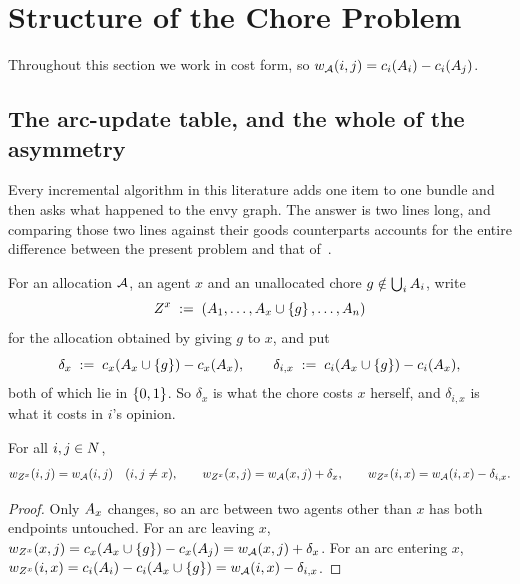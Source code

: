 \section{Structure of the Chore Problem}
\label{sec:structure}

Throughout this section we work in cost form, so
$w_{\mathcal{A}}(i,j) = c_i(A_{i}) - c_i(A_{j})$.

\subsection{The arc-update table, and the whole of the asymmetry}
\label{sec:arcupdate}

Every incremental algorithm in this literature adds one item to one bundle and
then asks what happened to the envy graph. The answer is two lines long, and
comparing those two lines against their goods counterparts accounts for the
entire difference between the present problem and that of~\cite{BKNS22}.

For an allocation $\mathcal{A}$, an agent $x$ and an unallocated chore
$g \notin \bigcup_i A_{i}$, write
\[
  Z^x \;:=\; (A_{1}, \dots, A_{x} \cup \left\{g\right\}, \dots, A_{n})
\]
for the allocation obtained by giving $g$ to $x$, and put
\[
  \delta_x \;:=\; c_x(A_{x} \cup \left\{g\right\}) - c_x(A_{x}),
  \qquad
  \delta_{i,x} \;:=\; c_i(A_{x} \cup \left\{g\right\}) - c_i(A_{x}),
\]
both of which lie in $\left\{0,1\right\}$. So $\delta_x$ is what the chore costs $x$
herself, and $\delta_{i,x}$ is what it costs in $i$'s opinion.

\begin{lemma}
\label{lem:arcupdate}
For all $i,j \in N$,
\[
  w_{Z^x}(i,j) = w_{\mathcal{A}}(i,j) \quad (i,j \ne x),
  \qquad
  w_{Z^x}(x,j) = w_{\mathcal{A}}(x,j) + \delta_x,
  \qquad
  w_{Z^x}(i,x) = w_{\mathcal{A}}(i,x) - \delta_{i,x}.
\]
\end{lemma}

\begin{proof}
Only $A_{x}$ changes, so an arc between two agents other than $x$ has both
endpoints untouched. For an arc leaving $x$,
$w_{Z^x}(x,j) = c_x(A_{x} \cup \left\{g\right\}) - c_x(A_{j})
= w_{\mathcal{A}}(x,j) + \delta_x$. For an arc entering $x$,
$w_{Z^x}(i,x) = c_i(A_{i}) - c_i(A_{x} \cup \left\{g\right\})
= w_{\mathcal{A}}(i,x) - \delta_{i,x}$.
\end{proof}

